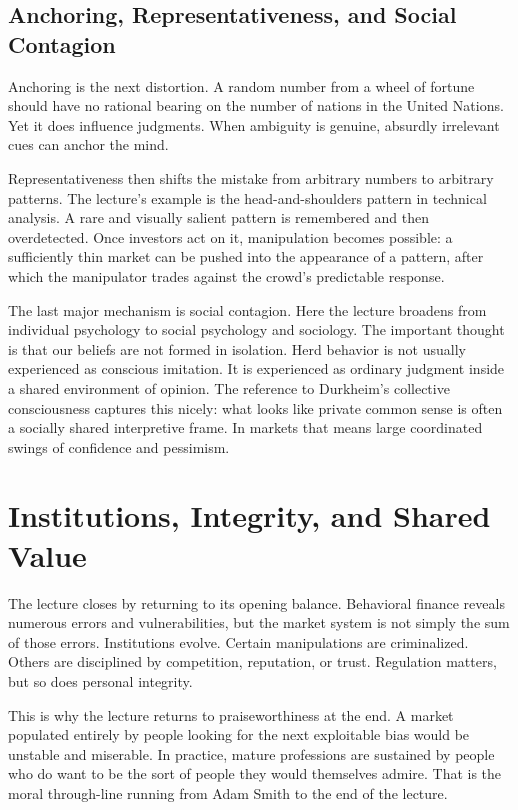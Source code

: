 \subsection{Anchoring, Representativeness, and Social Contagion}

Anchoring is the next distortion. A random number from a wheel of fortune should have no rational bearing on the number of nations in the United Nations. Yet it does influence judgments. When ambiguity is genuine, absurdly irrelevant cues can anchor the mind.

Representativeness then shifts the mistake from arbitrary numbers to arbitrary patterns. The lecture's example is the head-and-shoulders pattern in technical analysis. A rare and visually salient pattern is remembered and then overdetected. Once investors act on it, manipulation becomes possible: a sufficiently thin market can be pushed into the appearance of a pattern, after which the manipulator trades against the crowd's predictable response.

The last major mechanism is social contagion. Here the lecture broadens from individual psychology to social psychology and sociology. The important thought is that our beliefs are not formed in isolation. Herd behavior is not usually experienced as conscious imitation. It is experienced as ordinary judgment inside a shared environment of opinion. The reference to Durkheim's collective consciousness captures this nicely: what looks like private common sense is often a socially shared interpretive frame. In markets that means large coordinated swings of confidence and pessimism.

\section{Institutions, Integrity, and Shared Value}

The lecture closes by returning to its opening balance. Behavioral finance reveals numerous errors and vulnerabilities, but the market system is not simply the sum of those errors. Institutions evolve. Certain manipulations are criminalized. Others are disciplined by competition, reputation, or trust. Regulation matters, but so does personal integrity.

This is why the lecture returns to praiseworthiness at the end. A market populated entirely by people looking for the next exploitable bias would be unstable and miserable. In practice, mature professions are sustained by people who do want to be the sort of people they would themselves admire. That is the moral through-line running from Adam Smith to the end of the lecture.

